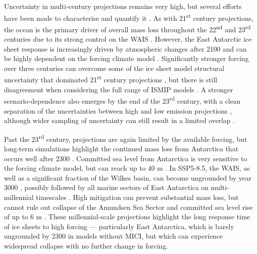 Uncertainty in multi-century projections remains very high, but several efforts have been made to characterise and quantify it \citep{bulthuisUncertaintyQuantificationMulticentennial2019,coulonDisentanglingDriversFuture2024,coulonShorttermUncertaintiesLongterm2025}. As with 21\textsuperscript{st} century projections, the ocean is the primary driver of overall mass loss throughout the 22\textsuperscript{nd} and 23\textsuperscript{rd} centuries due to its strong control on the WAIS \citep{bulthuisUncertaintyQuantificationMulticentennial2019,greveFutureProjectionsAntarctic2023,coulonDisentanglingDriversFuture2024}. However, the East Antarctic ice sheet response is increasingly driven by atmospheric changes after 2100 and can be highly dependent on the forcing climate model \citep{coulonShorttermUncertaintiesLongterm2025}. Significantly stronger forcing over three centuries can overcome some of the ice sheet model structural uncertainty that dominated 21\textsuperscript{st} century projections \citep{coulonShorttermUncertaintiesLongterm2025}, but there is still disagreement when considering the full range of ISMIP models \citep{seroussiEvolutionAntarcticIce2024}. A stronger scenario-dependence also emerges by the end of the 23\textsuperscript{rd} century, with a clean separation of the uncertainties between high and low emission projections \citep{fox-kemperOceanCryosphereSea2021,greveFutureProjectionsAntarctic2023,coulonDisentanglingDriversFuture2024,kloseLongtermSealevelCommitment2024}, although wider sampling of uncertainty can still result in a limited overlap \citep{coulonShorttermUncertaintiesLongterm2025}.

Past the 23\textsuperscript{rd} century, projections are again limited by the available forcing, but long-term simulations highlight the continued mass loss from Antarctica that occurs well after 2300 \citep{golledgeMultimillennialAntarcticCommitment2015,bulthuisUncertaintyQuantificationMulticentennial2019,kloseLongtermSealevelCommitment2024,coulonDisentanglingDriversFuture2024,coulonShorttermUncertaintiesLongterm2025}. Committed sea level from Antarctica is very sensitive to the forcing climate model, but can reach up to 40 m \citep{kloseLongtermSealevelCommitment2024}. In SSP5-8.5, the WAIS, as well as a significant fraction of the Wilkes basin, can become ungrounded by year 3000 \citep{bulthuisUncertaintyQuantificationMulticentennial2019,coulonDisentanglingDriversFuture2024,coulonShorttermUncertaintiesLongterm2025}, possibly followed by all marine sectors of East Antarctica on multi-millennial timescales \citep{kloseLongtermSealevelCommitment2024}. High mitigation can prevent substantial mass loss, but cannot rule out collapse of the Amundsen Sea Sector and committed sea level rise of up to 6 m \citep{kloseLongtermSealevelCommitment2024}. These millennial-scale projections highlight the long response time of ice sheets to high forcing --- particularly East Antarctica, which is barely ungrounded by 2300 in models without MICI, but which can experience widespread collapse with no further change in forcing.